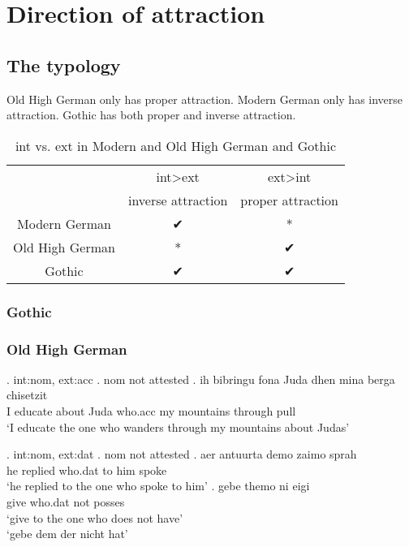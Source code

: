 
\chapter{Direction of attraction}


\section{The typology}
Old High German only has proper attraction. Modern German only has inverse attraction. Gothic has both proper and inverse attraction.


\begin{table}[h]
	\center
	\caption {\ac{int} vs. \ac{ext} in Modern and Old High German and Gothic}
		\begin{tabular}{ccc}
		\toprule
		 								& \ac{int}>\ac{ext}				& \ac{ext}>\ac{int}				\\
										& inverse attraction	& proper attraction		\\
										\cmidrule{2-3}
		Modern German 	& ✔			 							&	*										\\
		Old High German	& *										&	✔										\\
		Gothic					&	✔										&	✔										\\
		\bottomrule
		\end{tabular}
\end{table}



\subsection{Gothic}





\subsection{Old High German}


\ex. \ac{int}:\ac{nom}, \ac{ext}:\ac{acc}
\a. \ac{nom} not attested
\bg. ih bibringu fona Juda dhen mina berga chisetzit\\
 I educate\scsub{[acc]} about Juda who.\ac{acc} my mountains {through pull}\scsub{[nom]}\\
 `I educate the one who wanders through my mountains about Judas' 

\ex. \ac{int}:\ac{nom}, \ac{ext}:\ac{dat}
\a. \ac{nom} not attested
\bg. aer antuurta demo zaimo sprah\\
 he replied\scsub{[dat]} who.\ac{dat} {to him} spoke\scsub{[nom]}\\
 `he replied to the one who spoke to him' 
\bg. gebe themo ni eigi\\
 give\scsub{[dat]} who.\ac{dat} not posses\scsub{[nom]}\\
 `give to the one who does not have' \\
 `gebe dem der nicht hat' 

